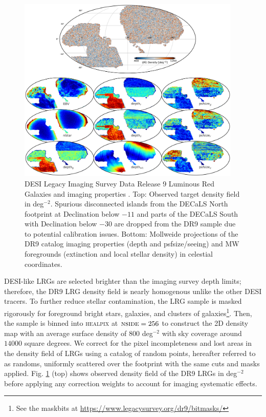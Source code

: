 \begin{figure}
    \centering
    \includegraphics[width=0.95\textwidth]{figures/dr9data.pdf}
    \caption{DESI Legacy Imaging Survey Data Release 9 Luminous Red Galaxies and imaging properties \citep{dey2018overview}. Top: Observed target density field in deg$^{-2}$. Spurious disconnected islands from the DECaLS North footprint at Declination below $-11$ and parts of the DECaLS South with Declination below $-30$ are dropped from the DR9 sample due to potential calibration issues. Bottom: Mollweide projections of the DR9 catalog imaging properties (depth and psfsize/seeing) and MW foregrounds (extinction and local stellar density) in celestial coordinates.}
    \label{fig:ng}
\end{figure}

DESI-like LRGs are selected brighter than the imaging survey depth limits; therefore, the DR9 LRG density field is nearly homogenous unlike the other DESI tracers. To further reduce stellar contamination, the LRG sample is masked rigorously for foreground bright stars, galaxies, and clusters of galaxies\footnote{See the maskbits at \url{https://www.legacysurvey.org/dr9/bitmasks/}}. Then, the sample is binned into \textsc{healpix} \citep{gorski2005healpix} at $\textsc{nside}=256$ to construct the 2D density map with an average surface density of $800$ deg$^{-2}$ with sky coverage around $14000$ square degrees. We correct for the pixel incompleteness and lost areas in the density field of LRGs using a catalog of random points, hereafter referred to as randoms, uniformly scattered over the footprint with the same cuts and masks applied. Fig. \ref{fig:ng} (top) shows observed density field of the DR9 LRGs in deg$^{-2}$ before applying any correction weights to account for imaging systematic effects.

